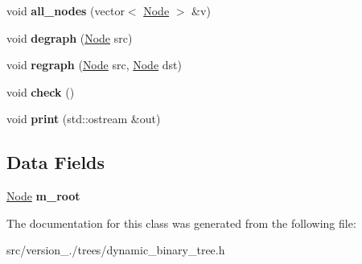 \begin{DoxyCompactItemize}
\item 
\mbox{\label{classez_1_1trees_1_1DynamicBinaryTree_af9204bdfd570e7b987b1edc4b4c796f0}} 
void {\bfseries all\+\_\+nodes} (vector$<$ \hyperlink{classez_1_1trees_1_1DynamicBinaryNode}{Node} $>$ \&v)
\item 
\mbox{\label{classez_1_1trees_1_1DynamicBinaryTree_a9f323dc1bef791820409359221a1b622}} 
void {\bfseries degraph} (\hyperlink{classez_1_1trees_1_1DynamicBinaryNode}{Node} src)
\item 
\mbox{\label{classez_1_1trees_1_1DynamicBinaryTree_a4f1311d938c6a28e11022f27ad82d7aa}} 
void {\bfseries regraph} (\hyperlink{classez_1_1trees_1_1DynamicBinaryNode}{Node} src, \hyperlink{classez_1_1trees_1_1DynamicBinaryNode}{Node} dst)
\item 
\mbox{\label{classez_1_1trees_1_1DynamicBinaryTree_a991ca1eb03e7095274f3ea32cd4c3b85}} 
void {\bfseries check} ()
\item 
\mbox{\label{classez_1_1trees_1_1DynamicBinaryTree_a3688914d22be9094da4e2f4f1bbcb7f2}} 
void {\bfseries print} (std\+::ostream \&out)
\end{DoxyCompactItemize}
\subsection*{Data Fields}
\begin{DoxyCompactItemize}
\item 
\mbox{\label{classez_1_1trees_1_1DynamicBinaryTree_a3d1116a396abb48d1ee8378ad7c395d5}} 
\hyperlink{classez_1_1trees_1_1DynamicBinaryNode}{Node} {\bfseries m\+\_\+root}
\end{DoxyCompactItemize}


The documentation for this class was generated from the following file\+:\begin{DoxyCompactItemize}
\item 
src/version\+\_./trees/dynamic\+\_\+binary\+\_\+tree.\+h\end{DoxyCompactItemize}
